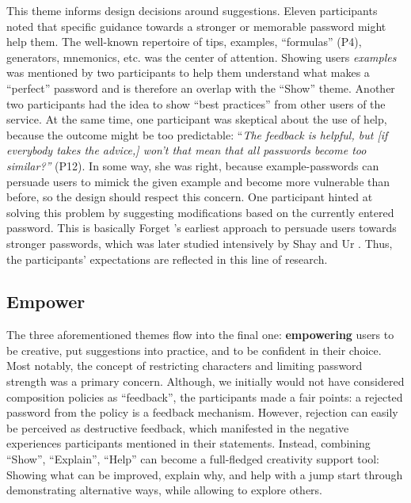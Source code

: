 This theme informs design decisions around suggestions. Eleven participants noted that specific guidance towards a stronger or memorable password might help them. The well-known repertoire of tips, examples, ``formulas'' (P4), generators, mnemonics, etc. was the center of attention. Showing users \textit{examples} was mentioned by two participants to help them understand what makes a ``perfect'' password and is therefore an overlap with the ``Show'' theme. Another two participants had the idea to show ``best practices'' from other users of the service. At the same time, one participant was skeptical about the use of help, because the outcome might be too predictable: ``\textit{The feedback is helpful, but [if everybody takes the advice,] won't that mean that all passwords become too similar?''} (P12). In some way, she was right, because example-passwords can persuade users to mimick the given example and become more vulnerable than before, so the design should respect this concern. One participant hinted at solving this problem by suggesting modifications based on the currently entered password. This is basically Forget \etal's earliest approach to persuade users towards stronger passwords, which was later studied intensively by Shay \etal \cite{Shay2015SpoonfulOfSugar} and Ur \etal \cite{Ur2017DataDrivenPWMeter}. Thus, the participants' expectations are reflected in this line of research.




\subsection{Empower}
The three aforementioned themes flow into the final one: \textbf{empowering} users to be creative, put suggestions into practice, and to be confident in their choice. Most notably, the concept of restricting characters and limiting password strength was a primary concern. Although, we initially would not have considered composition policies as ``feedback'', the participants made a fair points: a rejected password from the policy is a feedback mechanism. However, rejection can easily be perceived as destructive feedback, which manifested in the negative experiences participants mentioned in their statements. Instead, combining ``Show'', ``Explain'', ``Help'' can become a full-fledged creativity support tool: Showing what can be improved, explain why, and help with a jump start through demonstrating alternative ways, while allowing to explore others.

